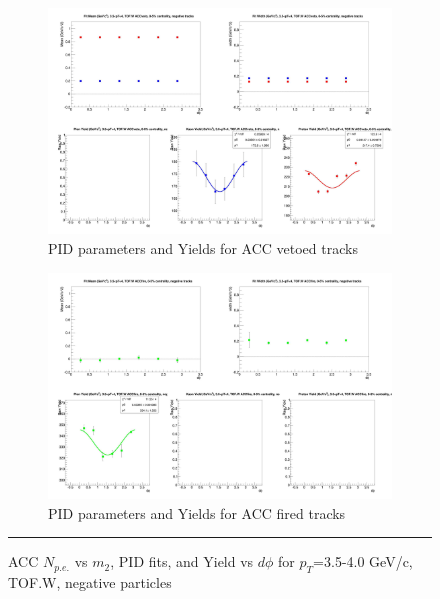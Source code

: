 \begin{figure}[H]
  \ContinuedFloat
    \begin{subfigure}{1\textwidth}
    \includegraphics[width=1\textwidth]{hiptfits/neg/fitParams_tof2_cent0_ch0_pT-35-40.jpg}
    \caption{PID parameters and Yields for ACC vetoed tracks}
    \end{subfigure}    
    \begin{subfigure}{1\textwidth}
    \includegraphics[width=1\textwidth]{hiptfits/neg/fitParams_tof3_cent0_ch0_pT-35-40.jpg}
    \caption{PID parameters and Yields for ACC fired tracks}
    \end{subfigure} 
    \rule{35em}{0.5pt}
  \caption[ACC $N_{p.e.}$ vs $m_2$, PID fits, and Yield vs $d\phi$ for $p_T$=3.5-4.0 GeV/c, TOF.W, negative particles]{ACC $N_{p.e.}$ vs $m_2$, PID fits, and Yield vs $d\phi$ for $p_T$=3.5-4.0 GeV/c, TOF.W, negative particles}
  \label{fig:acc35-40neg}
\end{figure}

